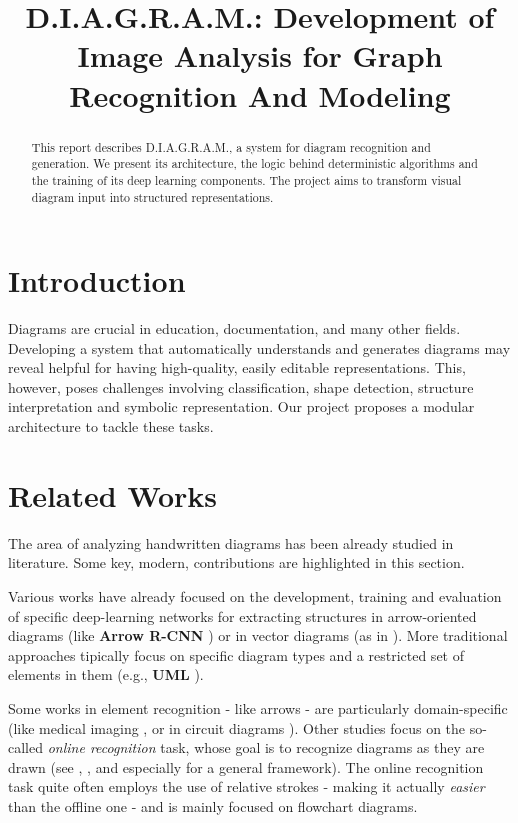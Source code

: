 \documentclass[conference]{IEEEtran}
\title{D.I.A.G.R.A.M.: Development of Image Analysis for Graph Recognition And Modeling}
\author{
    \IEEEauthorblockN{Filippo Garagnani, Saverio Napolitano, Nicola Ricciardi}
    \IEEEauthorblockA{
        'Computer Vision and Cognitive System' course \\
        \textit{Università di Modena e Reggio Emilia}
    }
}
\begin{document}
\maketitle

\begin{abstract}
This report describes D.I.A.G.R.A.M., a system for diagram recognition and generation. We present its architecture, the logic behind deterministic algorithms and the training of its deep learning components. The project aims to transform visual diagram input into structured representations.
\end{abstract}

\section{Introduction}
Diagrams are crucial in education, documentation, and many other fields. Developing a system that automatically understands and generates diagrams may reveal helpful for having high-quality, easily editable representations. This, however, poses challenges involving classification, shape detection, structure interpretation and symbolic representation. Our project proposes a modular architecture to tackle these tasks.

\section{Related Works}
The area of analyzing handwritten diagrams has been already studied in literature. Some key, modern, contributions are highlighted in this section.

Various works have already focused on the development, training and evaluation of specific deep-learning networks for extracting structures in arrow-oriented diagrams (like \textbf{Arrow R-CNN} \cite{arrowrcnn}) or in vector diagrams (as in \cite{sketchdiagram}). More traditional approaches tipically focus on specific diagram types and a restricted set of elements in them (e.g., \textbf{UML} \cite{interactiveUML}). 

Some works in element recognition - like arrows - are particularly domain-specific (like medical imaging \cite{med1}\cite{med2}, or in circuit diagrams \cite{2024modular}). Other studies focus on the so-called \textit{online recognition} task, whose goal is to recognize diagrams as they are drawn (see \cite{online1}, \cite{online2}, \cite{online3} and especially \cite{framework} for a general framework). The online recognition task quite often employs the use of relative strokes - making it actually \textit{easier} than the offline one - and is mainly focused on flowchart diagrams.
\end{document}
